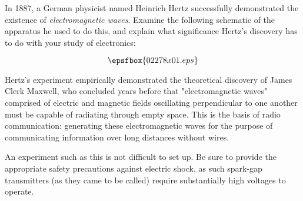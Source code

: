 

In 1887, a German physicist named Heinrich Hertz successfully demonstrated the existence of {\it electromagnetic waves}.  Examine the following schematic of the apparatus he used to do this, and explain what significance Hertz's discovery has to do with your study of electronics:

$$\epsfbox{02278x01.eps}$$







Hertz's experiment empirically demonstrated the theoretical discovery of James Clerk Maxwell, who concluded years before that "electromagnetic waves" comprised of electric and magnetic fields oscillating perpendicular to one another must be capable of radiating through empty space.  This is the basis of radio communication: generating these electromagnetic waves for the purpose of communicating information over long distances without wires.







An experiment such as this is not difficult to set up.  Be sure to provide the appropriate safety precautions against electric shock, as such spark-gap transmitters (as they came to be called) require substantially high voltages to operate.




